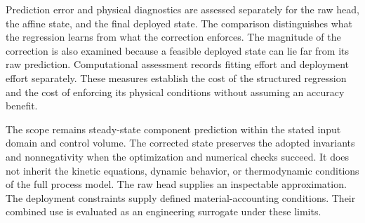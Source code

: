 Prediction error and physical diagnostics are assessed separately for the raw head, the affine state, and the final deployed state. The comparison distinguishes what the regression learns from what the correction enforces. The magnitude of the correction is also examined because a feasible deployed state can lie far from its raw prediction. Computational assessment records fitting effort and deployment effort separately. These measures establish the cost of the structured regression and the cost of enforcing its physical conditions without assuming an accuracy benefit.

The scope remains steady-state component prediction within the stated input domain and control volume. The corrected state preserves the adopted invariants and nonnegativity when the optimization and numerical checks succeed. It does not inherit the kinetic equations, dynamic behavior, or thermodynamic conditions of the full process model. The raw head supplies an inspectable approximation. The deployment constraints supply defined material-accounting conditions. Their combined use is evaluated as an engineering surrogate under these limits.
